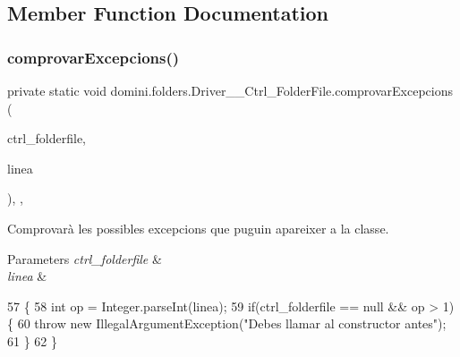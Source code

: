 \subsection{Member Function Documentation}
\mbox{\label{classdomini_1_1folders_1_1Driver____Ctrl__FolderFile_add85c568af9cc21b5b4dc8c413b8d565}} 
\subsubsection{\texorpdfstring{comprovar\+Excepcions()}{comprovarExcepcions()}}
{\footnotesize\ttfamily private static void domini.\+folders.\+Driver\+\_\+\+\_\+\+Ctrl\+\_\+\+Folder\+File.\+comprovar\+Excepcions (\begin{DoxyParamCaption}\item[{\hyperlink{classdomini_1_1folders_1_1Ctrl__FolderFile}{Ctrl\+\_\+\+Folder\+File}}]{ctrl\+\_\+folderfile,  }\item[{String}]{linea }\end{DoxyParamCaption})\hspace{0.3cm}{\ttfamily [inline]}, {\ttfamily [static]}, {\ttfamily [private]}}



Comprovarà les possibles excepcions que puguin apareixer a la classe. 


\begin{DoxyParams}{Parameters}
{\em ctrl\+\_\+folderfile} & \\
\hline
{\em linea} & \\
\hline
\end{DoxyParams}

\begin{DoxyCode}
57                                                                                           \{
58         \textcolor{keywordtype}{int} op = Integer.parseInt(linea);
59         \textcolor{keywordflow}{if}(ctrl\_folderfile == null && op > 1) \{
60             \textcolor{keywordflow}{throw} \textcolor{keyword}{new} IllegalArgumentException(\textcolor{stringliteral}{"Debes llamar al constructor antes"});
61         \}
62     \}
\end{DoxyCode}
\mbox{\label{classdomini_1_1folders_1_1Driver____Ctrl__FolderFile_abc98f0085a68ed640e01816cd9a389ef}} 
